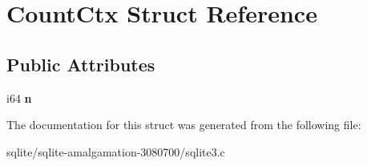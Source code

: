 \hypertarget{struct_count_ctx}{\section{Count\+Ctx Struct Reference}
\label{struct_count_ctx}
}
\subsection*{Public Attributes}
\begin{DoxyCompactItemize}
\item 
\hypertarget{struct_count_ctx_a141c718918dbfaa183f772bfd7a516f4}{i64 {\bfseries n}}\label{struct_count_ctx_a141c718918dbfaa183f772bfd7a516f4}

\end{DoxyCompactItemize}


The documentation for this struct was generated from the following file\+:\begin{DoxyCompactItemize}
\item 
sqlite/sqlite-\/amalgamation-\/3080700/sqlite3.\+c\end{DoxyCompactItemize}
